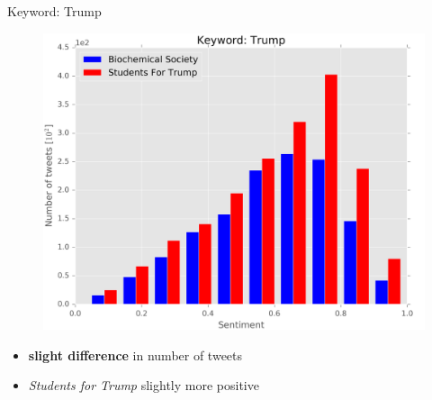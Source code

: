 \documentclass[notheorems,12pt]{beamer}
\begin{document}
\begin{frame}{Keyword: Trump}
    \begin{figure}
        \centering
        \includegraphics[scale=0.37]{./Pics/trump.png}
    \end{figure}
    \vspace{-0.4cm}
    \begin{itemize}
        \item \textbf{slight difference} in number of tweets
        \item \textit{Students for Trump} slightly more positive
    \end{itemize}
\end{frame}
\end{document}
